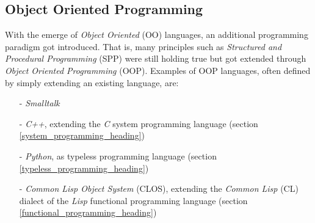 %
%
%
%
%
%
%

\subsection{Object Oriented Programming}
\label{object_oriented_programming_heading}

With the emerge of \emph{Object Oriented} (OO) languages, an additional
programming paradigm got introduced. That is, many principles such as
\emph{Structured and Procedural Programming} (SPP) were still holding true but
got extended through \emph{Object Oriented Programming} (OOP). Examples of OOP
languages, often defined by simply extending an existing language, are:

\begin{itemize}
    \item[-] \emph{Smalltalk} \cite{smalltalk}
    \item[-] \emph{C++}, extending the \emph{C} system programming language
        (section \ref{system_programming_heading})
    \item[-] \emph{Python}, as typeless programming language
        (section \ref{typeless_programming_heading})
    \item[-] \emph{Common Lisp Object System} (CLOS), extending the
        \emph{Common Lisp} (CL)\\dialect of the \emph{Lisp} functional
        programming language (section \ref{functional_programming_heading})
\end{itemize}

